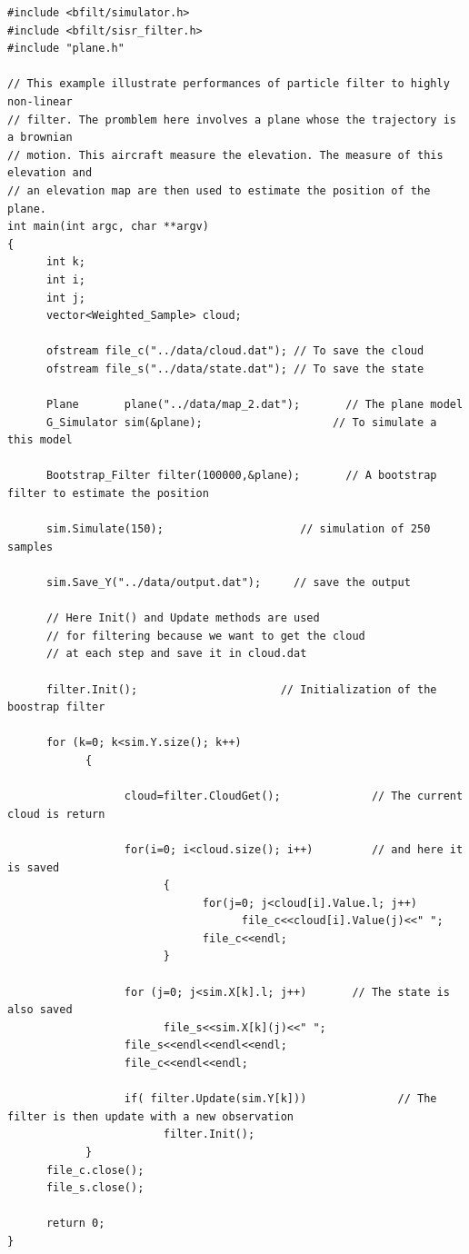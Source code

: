 \begin{DocInclude}\begin{verbatim}#include <bfilt/simulator.h>
#include <bfilt/sisr_filter.h>
#include "plane.h"

// This example illustrate performances of particle filter to highly non-linear 
// filter. The promblem here involves a plane whose the trajectory is a brownian
// motion. This aircraft measure the elevation. The measure of this elevation and 
// an elevation map are then used to estimate the position of the plane.
int main(int argc, char **argv)
{
      int k;
      int i;
      int j;
      vector<Weighted_Sample> cloud;

      ofstream file_c("../data/cloud.dat"); // To save the cloud
      ofstream file_s("../data/state.dat"); // To save the state

      Plane       plane("../data/map_2.dat");       // The plane model
      G_Simulator sim(&plane);                    // To simulate a this model
      
      Bootstrap_Filter filter(100000,&plane);       // A bootstrap filter to estimate the position

      sim.Simulate(150);                     // simulation of 250 samples

      sim.Save_Y("../data/output.dat");     // save the output

      // Here Init() and Update methods are used
      // for filtering because we want to get the cloud 
      // at each step and save it in cloud.dat

      filter.Init();                      // Initialization of the boostrap filter
      
      for (k=0; k<sim.Y.size(); k++)
            {

                  cloud=filter.CloudGet();              // The current cloud is return

                  for(i=0; i<cloud.size(); i++)         // and here it is saved
                        {
                              for(j=0; j<cloud[i].Value.l; j++)
                                    file_c<<cloud[i].Value(j)<<" ";
                              file_c<<endl;
                        }

                  for (j=0; j<sim.X[k].l; j++)       // The state is also saved
                        file_s<<sim.X[k](j)<<" ";
                  file_s<<endl<<endl<<endl;
                  file_c<<endl<<endl;

                  if( filter.Update(sim.Y[k]))              // The filter is then update with a new observation
                        filter.Init();
            }
      file_c.close();
      file_s.close();

      return 0;
}
\end{verbatim}
\end{DocInclude}
 